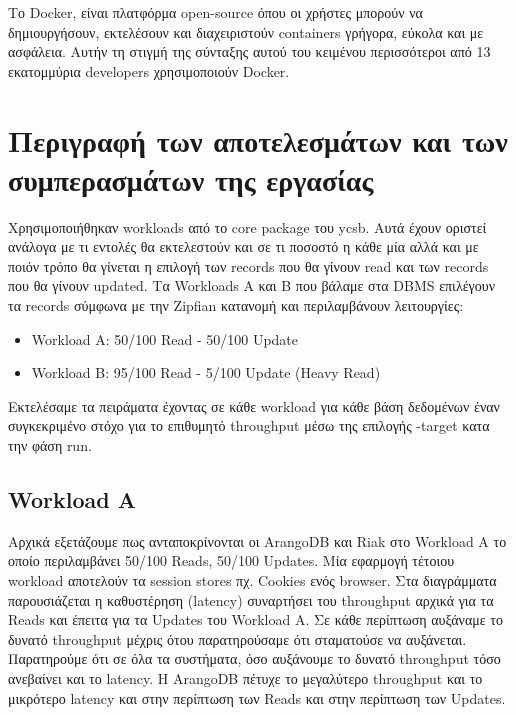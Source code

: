 \documentclass[conference]{IEEEtran}
\begin{document}
Το Docker, είναι πλατφόρμα open-source όπου οι χρήστες μπορούν να δημιουργήσουν, εκτελέσουν και διαχειριστούν containers γρήγορα, εύκολα και με ασφάλεια. Αυτήν τη στιγμή της σύνταξης αυτού του κειμένου περισσότεροι από 13 εκατομμύρια developers χρησιμοποιούν Docker.



\section{Περιγραφή των αποτελεσμάτων και των συμπερασμάτων της εργασίας}

Χρησιμοποιήθηκαν workloads από το core package του ycsb. Αυτά έχουν οριστεί ανάλογα με τι εντολές θα εκτελεστούν και σε τι ποσοστό η κάθε μία αλλά και με ποιόν τρόπο θα γίνεται η επιλογή των records που θα γίνουν read και των records που θα γίνουν updated. Τα Workloads Α και B που βάλαμε στα DBMS επιλέγουν τα records σύμφωνα με την Zipfian κατανομή και περιλαμβάνουν λειτουργίες:
\begin{itemize}
\item 
Workload A: 50/100 Read - 50/100 Update
\item 
Workload B: 95/100 Read - 5/100 Update (Heavy Read)
\end{itemize}


Εκτελέσαμε τα πειράματα έχοντας σε κάθε workload για κάθε βάση δεδομένων έναν συγκεκριμένο στόχο για το επιθυμητό throughput μέσω της επιλογής -target κατα την φάση run. 

\subsection{Workload A}    
Αρχικά εξετάζουμε πως ανταποκρίνονται οι ArangoDB και Riak στο Workload A το οποίο περιλαμβάνει 50/100 Reads, 50/100 Updates.  Μία εφαρμογή τέτοιου workload αποτελούν τα session stores πχ. Cookies ενός browser.  Στα διαγράμματα παρουσιάζεται η καθυστέρηση (latency) συναρτήσει του throughput αρχικά για τα Reads και έπειτα για τα  Updates του Workload A. Σε κάθε περίπτωση αυξάναμε το δυνατό throughput μέχρις ότου παρατηρούσαμε ότι σταματούσε να αυξάνεται. Παρατηρούμε ότι σε όλα τα συστήματα, όσο αυξάνουμε το δυνατό throughput τόσο ανεβαίνει και το latency. Η ArangoDB πέτυχε το μεγαλύτερο throughput και το μικρότερο latency και στην περίπτωση των Reads και στην περίπτωση των Updates. 
\end{document}
